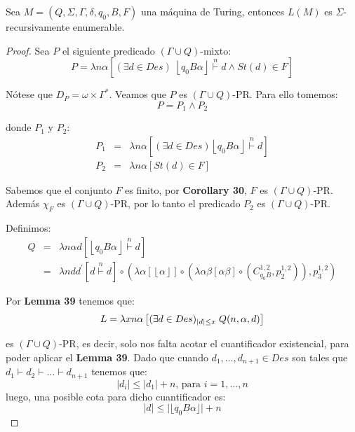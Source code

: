   \begin{theorem}
  	\PN Sea $M = \left(Q, \Sigma, \Gamma, \delta, q_{0}, B, F\right)$ una máquina de Turing, entonces $L(M)$ es
    $\Sigma$-recursivamente enumerable.
  \end{theorem}
  \begin{proof}
    \PN Sea $P$ el siguiente predicado $(\Gamma \cup Q)$-mixto:
    \[
      P = \lambda n\alpha \left[(\exists d \in Des) \; \left\lfloor q_{0} B \alpha \right\rfloor \overset{n}{\vdash} d
      \wedge St(d) \in F\right]
    \]

    \PN Nótese que $D_{P} = \omega \times \Gamma^{\ast}$. Veamos que $P$ es $(\Gamma \cup Q)$-PR. Para ello tomemos:
    \[
      P = P_1 \land P_2
    \]

    \PN donde $P_1$ y $P_2$:
    \begin{eqnarray*}
      P_1 &=& \lambda n\alpha \left[(\exists d \in Des) \left\lfloor q_{0} B \alpha \right\rfloor \overset{n}{\vdash}
        d\right] \\
      P_2 &=& \lambda n\alpha \left[St(d) \in F\right]
    \end{eqnarray*}

    \PN Sabemos que el conjunto $F$ es finito, por \textbf{Corollary 30}, $F$ es $(\Gamma \cup Q)$-PR. Además $\chi_F$
    es $(\Gamma \cup Q)$-PR, por lo tanto el predicado $P_2$ es $(\Gamma \cup Q)$-PR.

    \PN Definimos:
    \begin{eqnarray*}
      Q &=& \lambda n\alpha d \left[ \left\lfloor q_{0} B \alpha \right\rfloor \overset{n}{\vdash} d\right] \\
        &=& \lambda ndd^{\prime} \left[d \overset{n}{\vdash} d\right] \circ (\lambda \alpha \left[\left\lfloor \alpha
        \right\rfloor\right] \circ(\lambda \alpha\beta \left[\alpha\beta\right] \circ (C_{q_0 B}^{1,2}, p_{2}^{1,2})),
        p_{3}^{1,2})
    \end{eqnarray*}

    \PN Por \textbf{Lemma 39} tenemos que:
    \[
      L = \lambda x n\alpha \left[ (\exists d\in Des)_{\lvert d \rvert \leq x}\; Q(n, \alpha, d)\right] \\[10pt]
    \]

    \PN es $(\Gamma \cup Q)$-PR, es decir, solo nos falta acotar el cuantificador existencial, para poder aplicar el
    \textbf{Lemma 39}. Dado que cuando $d_{1},\dotsc,d_{n+1} \in Des$ son tales que $d_{1} \vdash d_{2} \vdash \dotsc
    \vdash d_{n+1}$ tenemos que:
    \[
      \left\vert d_{i} \right\vert \leq \left\vert d_{1} \right\vert + n \text{, para } i=1, \dotsc, n
    \]
    \PN luego, una posible cota para dicho cuantificador es:
    \[
      \lvert d \rvert \leq \lvert\lfloor q_{0} B \alpha \rfloor\rvert + n
    \]


\end{proof}
